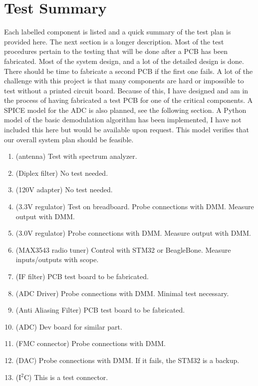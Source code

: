 \documentclass[a4paper, 12pt]{article}
\begin{document}
\section{Test Summary}

Each labelled component is listed and a quick summary of the test plan is provided here.  The next section is a longer description.  Most of the test procedures pertain to the testing that will be done after a PCB has been fabricated.  Most of the system design, and a lot of the detailed design is done.  There should be time to fabricate a second PCB if the first one fails.  A lot of the challenge with this project is that many components are hard or impossible to test without a printed circuit board.  Because of this, I have designed and am in the process of having fabricated a test PCB for one of the critical components.  A SPICE model for the ADC is also planned, see the following section.  A Python model of the basic demodulation algorithm has been implemented, I have not included this here but would be available upon request.  This model verifies that our overall system plan should be feasible.

\begin{enumerate}
  \item (antenna) Test with spectrum analyzer. %
  \item (Diplex filter) No test needed. %
  \item (120V adapter) No test needed. %
  \item (3.3V regulator) Test on breadboard.  Probe connections with DMM.  Measure output with DMM. %
  \item (3.0V regulator) Probe connections with DMM.  Measure output with DMM. %
  \item (MAX3543 radio tuner) Control with STM32 or BeagleBone.  Measure inputs/outputs with scope.%
  \item (IF filter) PCB test board to be fabricated. %
  \item (ADC Driver) Probe connections with DMM.  Minimal test necessary. %
  \item (Anti Aliasing Filter) PCB test board to be fabricated. %
  \item (ADC) Dev board for similar part. %
  \item (FMC connector) Probe connections with DMM. %
  \item (DAC) Probe connections with DMM.  If it fails, the STM32 is a backup. %
  \item (I$^2$C) This is a test connector. %
\end{enumerate}
\end{document}
